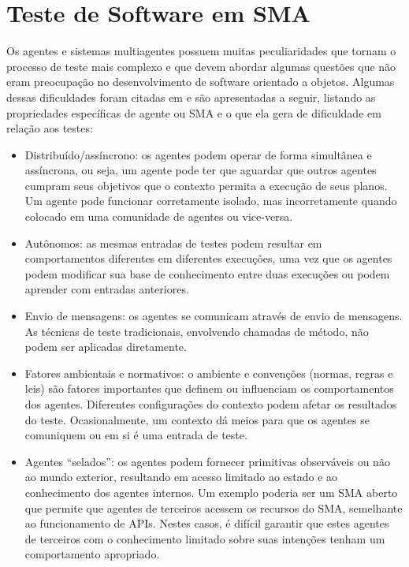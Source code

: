 \section{Teste de Software em SMA} \label{sec:testesma}

Os agentes e sistemas multiagentes possuem muitas peculiaridades que tornam o processo de teste mais complexo e que devem abordar algumas questões que não eram preocupação no desenvolvimento de software orientado a objetos. Algumas dessas dificuldades foram citadas em \cite{rouff2002test,houhamdi2011multi,nguyen2009thesis} e são apresentadas a seguir, listando as propriedades específicas de agente ou SMA e o que ela gera de dificuldade em relação aos testes:

\begin{itemize}
\item Distribuído/assíncrono: os agentes podem operar de forma simultânea e assíncrona, ou seja, um agente pode ter que aguardar que outros agentes cumpram seus objetivos que o contexto permita a execução de seus planos. Um agente pode funcionar corretamente isolado, mas incorretamente quando colocado em uma comunidade de agentes ou vice-versa.
\item Autônomos: as mesmas entradas de testes podem resultar em comportamentos diferentes em diferentes execuções, uma vez que os agentes podem modificar sua base de conhecimento entre duas execuções ou podem aprender com entradas anteriores.
\item Envio de mensagens: os agentes se comunicam através de envio de mensagens. As técnicas de teste tradicionais, envolvendo chamadas de método, não podem ser aplicadas diretamente.
\item Fatores ambientais e normativos: o ambiente e convenções (normas, regras e leis) são fatores importantes que definem ou influenciam os comportamentos dos agentes. Diferentes configurações do contexto podem afetar os resultados do teste. Ocasionalmente, um contexto dá meios para que os agentes se comuniquem ou em si é uma entrada de teste.
\item Agentes “selados”: os agentes podem fornecer primitivas observáveis ou não ao mundo exterior, resultando em acesso limitado ao estado e ao conhecimento dos agentes internos. Um exemplo poderia ser um SMA aberto que permite que agentes de terceiros acessem os recursos do SMA, semelhante ao funcionamento de APIs. Nestes casos, é difícil garantir que estes agentes de terceiros com o conhecimento limitado sobre suas intenções tenham um comportamento apropriado.
\end{itemize}

